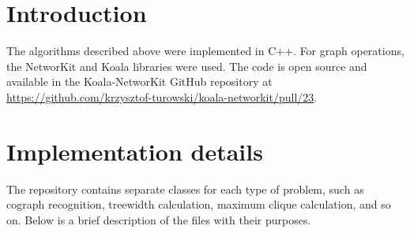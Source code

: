 \label{last}
\section{Introduction}
The algorithms described above were implemented in C++. For graph operations, the NetworKit and Koala libraries were used. The code is open source and available in the Koala-NetworKit GitHub repository at 
\url{https://github.com/krzysztof-turowski/koala-networkit/pull/23}.

\section{Implementation details}
The repository contains separate classes for each type of problem, such as cograph recognition, treewidth calculation, maximum clique calculation, and so on. Below is a brief description of the files with their purposes.
